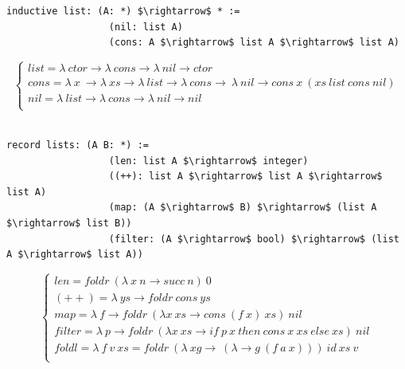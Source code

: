 \documentclass[11pt,oneside]{article}
\begin{document}
\begin{lstlisting}[mathescape=true]
        inductive list: (A: *) $\rightarrow$ * :=
                  (nil: list A)
                  (cons: A $\rightarrow$ list A $\rightarrow$ list A)
\end{lstlisting}
$$
\begin{cases}
list = \lambda\ ctor \rightarrow \lambda\ cons \rightarrow \lambda\ nil \rightarrow ctor\\
cons = \lambda\ x\ \rightarrow \lambda\ xs \rightarrow \lambda\ list \rightarrow \lambda\ cons \rightarrow\ \lambda\ nil \rightarrow cons\ x\ (xs\ list\ cons\ nil)\\
nil = \lambda\ list \rightarrow \lambda\ cons \rightarrow \lambda\ nil \rightarrow nil\\
\end{cases}
$$
\\
\begin{lstlisting}[mathescape=true]
           record lists: (A B: *) :=
                  (len: list A $\rightarrow$ integer)
                  ((++): list A $\rightarrow$ list A $\rightarrow$ list A)
                  (map: (A $\rightarrow$ B) $\rightarrow$ (list A $\rightarrow$ list B))
                  (filter: (A $\rightarrow$ bool) $\rightarrow$ (list A $\rightarrow$ list A))
\end{lstlisting}
$$
\begin{cases}
len = foldr\ (\lambda\ x\ n \rightarrow succ\ n)\ 0\\
(++) = \lambda\ ys \rightarrow foldr\ cons\ ys\\
map = \lambda\ f \rightarrow foldr\ (\lambda x\ xs \rightarrow cons\ (f\ x)\ xs)\ nil\\
filter = \lambda\ p \rightarrow foldr\ (\lambda x\ xs \rightarrow if\ p\ x\ then\ cons\ x\ xs\ else\ xs)\ nil\\
foldl = \lambda\ f\ v\ xs = foldr\ (\lambda\ xg\rightarrow\ (\lambda \rightarrow g\ (f\ a\ x)))\ id\ xs\ v\\
\end{cases}
$$


\end{document}
